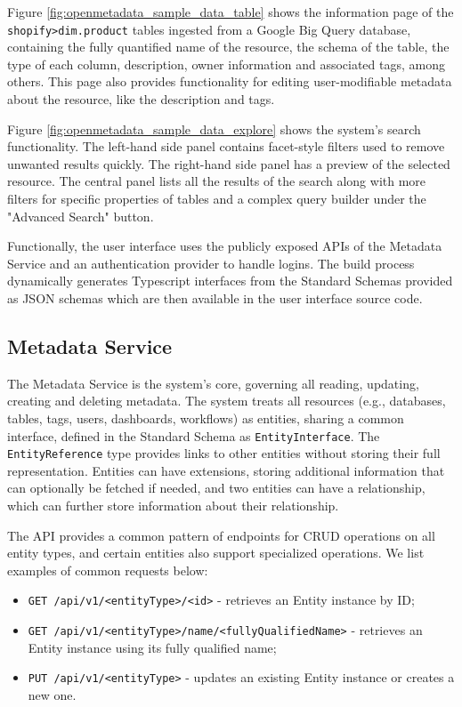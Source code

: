 Figure \ref{fig:openmetadata_sample_data_table} shows the information page of the \texttt{shopify>dim.product} tables ingested from a Google Big Query database, containing the fully quantified name of the resource, the schema of the table, the type of each column, description, owner information and associated tags, among others. This page also provides functionality for editing user-modifiable metadata about the resource, like the description and tags.

Figure \ref{fig:openmetadata_sample_data_explore} shows the system's search functionality. The left-hand side panel contains facet-style filters used to remove unwanted results quickly. The right-hand side panel has a preview of the selected resource. The central panel lists all the results of the search along with more filters for specific properties of tables and a complex query builder under the "Advanced Search" button.

Functionally, the user interface uses the publicly exposed APIs of the Metadata Service and an authentication provider to handle logins. The build process dynamically generates Typescript interfaces from the Standard Schemas provided as JSON schemas which are then available in the user interface source code.

\subsection{Metadata Service}

The Metadata Service is the system's core, governing all reading, updating, creating and deleting metadata. The system treats all resources (e.g., databases, tables, tags, users, dashboards, workflows) as entities, sharing a common interface, defined in the Standard Schema as \texttt{EntityInterface}. The \texttt{EntityReference} type provides links to other entities without storing their full representation. Entities can have extensions, storing additional information that can optionally be fetched if needed, and two entities can have a relationship, which can further store information about their relationship.

The API provides a common pattern of endpoints for CRUD operations on all entity types, and certain entities also support specialized operations. We list examples of common requests below:

\begin{itemize}
    \item \texttt{GET /api/v1/<entityType>/<id>} - retrieves an Entity instance by ID;
    \item \texttt{GET /api/v1/<entityType>/name/<fullyQualifiedName>} - retrieves an Entity instance using its fully qualified name;
    \item \texttt{PUT /api/v1/<entityType>} - updates an existing Entity instance or creates a new one.
\end{itemize}

